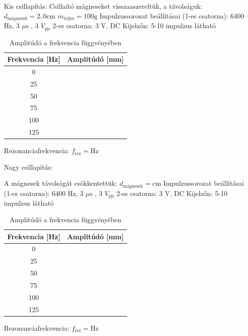 \documentclass{article}
\begin{document}
Kis csillapítás: 
Csillaító mágneseket visszaaszereltük, a távolságuk:
$d_{\text{mágnesek}} = 2,0 \text{cm}$
$m_{\text{teljes}} = 100 \text{g}$
Impulzussorozat beállításai (1-es csatorna): 6400 Hz, 3 $\mu\text{s}$ , 3 $V_{\text{pp}}$
2-es csatorna: 3 V, DC
Kijelzőn: 5-10 impulzus látható

\begin{table}[H]
    \centering
    \begin{tabular}{|c|c|}
        \hline
        Frekvencia [Hz] & Amplitúdó [mm] \\ \hline
          0 & \\ \hline 
          25 & \\ \hline
          50 & \\ \hline 
          75 & \\ \hline
          100 & \\ \hline 
          125 & \\ \hline
        
    \end{tabular}
    \caption{Amplitúdó a frekvencia függvényében}
    \label{tab:amplitudo}
\end{table}

Rezonanciafrekvencia: $f_{\text{rez}} = \text{Hz}$

Nagy csillapítás:

A mágnesek távolságát csökkentettük: $d_{\text{mágnesek}} = \text{cm}$
Impulzussorozat beállításai (1-es csatorna): 6400 Hz, 3 $\mu\text{s}$ , 3 $V_{\text{pp}}$
2-es csatorna: 3 V, DC
Kijelzőn: 5-10 impulzus látható

\begin{table}[H]
    \centering
    \begin{tabular}{|c|c|}
        \hline
        Frekvencia [Hz] & Amplitúdó [mm] \\ \hline
          0 & \\ \hline 
          25 & \\ \hline
          50 & \\ \hline 
          75 & \\ \hline
          100 & \\ \hline 
          125 & \\ \hline
        
    \end{tabular}
    \caption{Amplitúdó a frekvencia függvényében}
    \label{tab:amplitudo}
\end{table}

Rezonanciafrekvencia: $f_{\text{rez}} = \text{Hz}$
\end{document}
